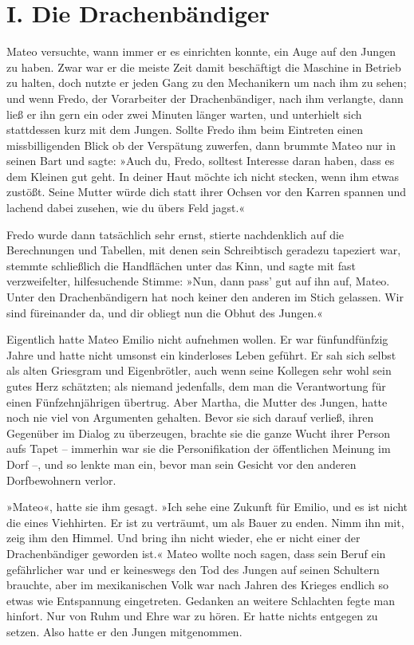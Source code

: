 \section{I. Die Drachenbändiger}

Mateo versuchte, wann immer er es einrichten konnte, ein Auge auf
den Jungen zu haben. Zwar war er die meiste Zeit damit beschäftigt
die Maschine in Betrieb zu halten, doch nutzte er jeden Gang zu den
Mechanikern um nach ihm zu sehen; und wenn Fredo, der Vorarbeiter
der Drachenbändiger, nach ihm verlangte, dann ließ er ihn gern ein
oder zwei Minuten länger warten, und unterhielt sich stattdessen
kurz mit dem Jungen. Sollte Fredo ihm beim Eintreten einen
missbilligenden Blick ob der Verspätung zuwerfen, dann brummte
Mateo nur in seinen Bart und sagte: »Auch du, Fredo, solltest
Interesse daran haben, dass es dem Kleinen gut geht. In deiner Haut
möchte ich nicht stecken, wenn ihm etwas zustößt. Seine Mutter
würde dich statt ihrer Ochsen vor den Karren spannen und lachend
dabei zusehen, wie du übers Feld jagst.«

Fredo wurde dann tatsächlich sehr ernst, stierte nachdenklich auf
die Berechnungen und Tabellen, mit denen sein Schreibtisch geradezu
tapeziert war, stemmte schließlich die Handflächen unter das Kinn,
und sagte mit fast verzweifelter, hilfesuchende Stimme: »Nun, dann
pass' gut auf ihn auf, Mateo. Unter den Drachenbändigern hat noch
keiner den anderen im Stich gelassen. Wir sind füreinander da, und
dir obliegt nun die Obhut des Jungen.«

\bigpar

Eigentlich hatte Mateo Emilio nicht aufnehmen wollen. Er war
fünfundfünfzig Jahre und hatte nicht umsonst ein kinderloses Leben
geführt. Er sah sich selbst als alten Griesgram und Eigenbrötler,
auch wenn seine Kollegen sehr wohl sein gutes Herz schätzten; als
niemand jedenfalls, dem man die Verantwortung für einen
Fünfzehnjährigen übertrug. Aber Martha, die Mutter des Jungen,
hatte noch nie viel von Argumenten gehalten. Bevor sie sich darauf
verließ, ihren Gegenüber im Dialog zu überzeugen, brachte sie die
ganze Wucht ihrer Person aufs Tapet – immerhin war sie die
Personifikation der öffentlichen Meinung im Dorf –, und so lenkte
man ein, bevor man sein Gesicht vor den anderen Dorfbewohnern
verlor.

»Mateo«, hatte sie ihm gesagt. »Ich sehe eine Zukunft für Emilio,
und es ist nicht die eines Viehhirten. Er ist zu verträumt, um als
Bauer zu enden. Nimm ihn mit, zeig ihm den Himmel. Und bring ihn
nicht wieder, ehe er nicht einer der Drachenbändiger geworden ist.«
Mateo wollte noch sagen, dass sein Beruf ein gefährlicher war und
er keineswegs den Tod des Jungen auf seinen Schultern brauchte,
aber im mexikanischen Volk war nach Jahren des Krieges endlich so
etwas wie Entspannung eingetreten. Gedanken an weitere Schlachten
fegte man hinfort. Nur von Ruhm und Ehre war zu hören. Er hatte
nichts entgegen zu setzen. Also hatte er den Jungen mitgenommen.


